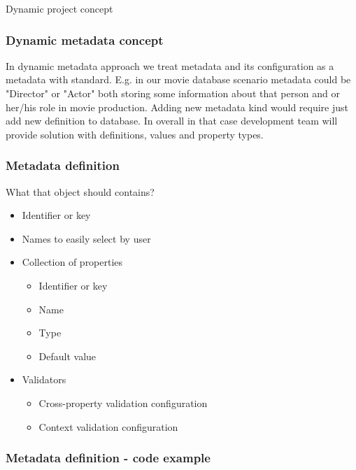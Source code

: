 \documentclass{beamer}
\begin{document}
\begin{section}{Dynamic project concept}

\begin{frame}
\frametitle{Dynamic metadata concept}

In dynamic metadata approach we treat metadata and its configuration as a metadata with standard. E.g. in our movie database scenario metadata could be "Director" or "Actor" both storing some information about that person and \/ or her/his role in movie production. Adding new metadata kind would require just add new definition to database. 
\newline
\newline
In overall in that case development team will provide solution with definitions, values and property types. 

\end{frame}

\begin{frame}
\frametitle{Metadata definition}

What that object should contains?\\

\begin{itemize}
	\item Identifier or key
	\item Names to easily select by user
	\item Collection of properties
		\begin{itemize}
			\item Identifier or key
			\item Name
			\item Type
			\item Default value
		\end{itemize}
	\item Validators
		\begin{itemize}
			\item Cross-property validation configuration
			\item Context validation configuration
		\end{itemize}
\end{itemize}

\end{frame}

\begin{frame}
\frametitle{Metadata definition - code example}





\end{frame}
\end{section}
\end{document}
